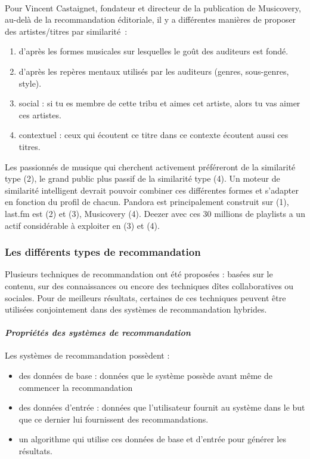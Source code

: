 \paragraph{}
Pour Vincent Castaignet, fondateur et directeur de la publication de Musicovery, au-delà de la recommandation éditoriale, il y a différentes manières de proposer des artistes/titres par similarité~:
\begin{enumerate}
	\item d’après les formes musicales sur lesquelles le goût des auditeurs est fondé.
	\item d’après les repères mentaux utilisés par les auditeurs (genres, sous-genres, style).
	\item social  : si tu es membre de cette tribu et aimes cet artiste, alors tu vas aimer ces artistes.
	\item contextuel  : ceux qui écoutent ce titre dans ce contexte écoutent aussi ces titres.
\end{enumerate}
Les passionnés de musique qui cherchent activement préféreront de la similarité type (2), le grand public plus passif de la similarité type (4). Un moteur de similarité intelligent devrait pouvoir combiner ces différentes formes et s’adapter en fonction du profil de chacun.
Pandora est principalement construit sur (1), last.fm est (2) et (3), Musicovery (4). Deezer avec ces 30 millions de playlists a un actif considérable à exploiter en (3) et (4).

 	\subsubsection{Les différents types de recommandation}
Plusieurs techniques de recommandation ont été proposées : basées sur le contenu, sur des connaissances ou encore des techniques dîtes collaboratives ou sociales. Pour de meilleurs résultats, certaines de ces techniques peuvent être utilisées conjointement dans des systèmes de recommandation hybrides.

	\paragraph{\emph{Propriétés des systèmes de recommandation} \\ \quad}
Les systèmes de recommandation possèdent :
\begin{itemize}
	\item des données de base : données que le système possède avant même de commencer la recommandation
	\item des données d’entrée : données que l’utilisateur fournit au système dans le but que ce dernier lui fournissent des recommandations.
	\item un algorithme qui utilise ces données de base et d’entrée pour générer les résultats.
\end{itemize}


